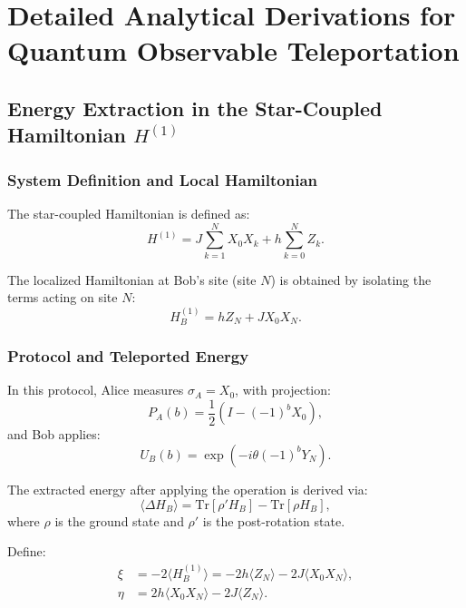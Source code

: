 \section{Detailed Analytical Derivations for Quantum Observable Teleportation}

\subsection{Energy Extraction in the Star-Coupled Hamiltonian \texorpdfstring{$H^{(1)}$}{H1}}

\subsubsection{System Definition and Local Hamiltonian}

The star-coupled Hamiltonian is defined as:
\begin{equation}
H^{(1)} = J \sum_{k=1}^{N} X_0 X_k + h \sum_{k=0}^{N} Z_k.
\end{equation}

The localized Hamiltonian at Bob's site (site \( N \)) is obtained by isolating the terms acting on site \( N \):
\begin{equation}
H_B^{(1)} = h Z_N + J X_0 X_N.
\end{equation}

\subsubsection{Protocol and Teleported Energy}

In this protocol, Alice measures \( \sigma_A = X_0 \), with projection:
\begin{equation}
P_A(b) = \frac{1}{2} \left( I - (-1)^b X_0 \right),
\end{equation}
and Bob applies:
\begin{equation}
U_B(b) = \exp(-i \theta (-1)^b Y_N).
\end{equation}

The extracted energy after applying the operation is derived via:
\begin{equation}
\langle \Delta H_B \rangle = \text{Tr}[\rho' H_B] - \text{Tr}[\rho H_B],
\end{equation}
where \( \rho \) is the ground state and \( \rho' \) is the post-rotation state.

Define:
\begin{align}
\xi &= -2 \langle H_B^{(1)} \rangle = -2h \langle Z_N \rangle - 2J \langle X_0 X_N \rangle, \\
\eta &= 2h \langle X_0 X_N \rangle - 2J \langle Z_N \rangle.
\end{align}

